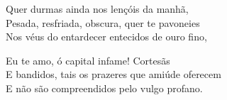 \noindent Quer durmas ainda nos lençóis da manhã,\\
Pesada, resfriada, obscura, quer te pavoneies\\ 
Nos véus do entardecer entecidos de ouro fino,\\\medskip

\noindent Eu te amo, ó capital infame! Cortesãs\\
E bandidos, tais os prazeres que amiúde oferecem\\
E não são compreendidos pelo vulgo profano.\\
\vfil


